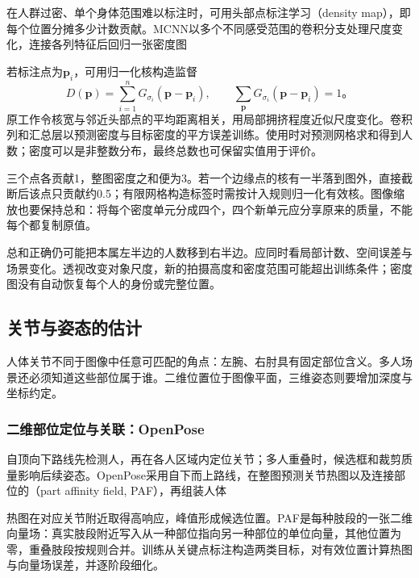 在人群过密、单个身体范围难以标注时，可用头部点标注学习（density map），即每个位置分摊多少计数贡献。MCNN以多个不同感受范围的卷积分支处理尺度变化，连接各列特征后回归一张密度图

若标注点为$\bm{p}_i$，可用归一化核构造监督
\begin{equation}
 D(\bm{p})=\sum_{i=1}^{n}G_{\sigma_i}(\bm{p}-\bm{p}_i),
 \qquad
 \sum_{\bm{p}}G_{\sigma_i}(\bm{p}-\bm{p}_i)=1\text{。}
 \label{eq:vision-density-target}
\end{equation}
原工作令核宽与邻近头部点的平均距离相关，用局部拥挤程度近似尺度变化。卷积列和汇总层以预测密度与目标密度的平方误差训练。使用时对预测网格求和得到人数；密度可以是非整数分布，最终总数也可保留实值用于评价。

三个点各贡献1，整图密度之和便为3。若一个边缘点的核有一半落到图外，直接截断后该点只贡献约0.5；有限网格构造标签时需按计入规则归一化有效核。图像缩放也要保持总和：将每个密度单元分成四个，四个新单元应分享原来的质量，不能每个都复制原值。

总和正确仍可能把本属左半边的人数移到右半边。应同时看局部计数、空间误差与场景变化。透视改变对象尺度，新的拍摄高度和密度范围可能超出训练条件；密度图没有自动恢复每个人的身份或完整位置。

\subsection{关节与姿态的估计}
\label{sec:vision-recognition-pose}

人体关节不同于图像中任意可匹配的角点：左腕、右肘具有固定部位含义。多人场景还必须知道这些部位属于谁。二维位置位于图像平面，三维姿态则要增加深度与坐标约定。

\subsubsection{二维部位定位与关联：OpenPose}
\label{sec:vision-recognition-openpose}

自顶向下路线先检测人，再在各人区域内定位关节；多人重叠时，候选框和裁剪质量影响后续姿态。OpenPose采用自下而上路线，在整图预测关节热图以及连接部位的（part affinity field, PAF），再组装人体

热图在对应关节附近取得高响应，峰值形成候选位置。PAF是每种肢段的一张二维向量场：真实肢段附近写入从一种部位指向另一种部位的单位向量，其他位置为零，重叠肢段按规则合并。训练从关键点标注构造两类目标，对有效位置计算热图与向量场误差，并逐阶段细化。


